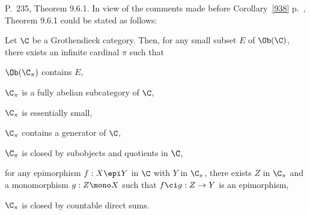 \documentclass[12pt]{article}
\theoremstyle{remark}
\theoremstyle{definition}
\begin{document}


\begin{s} 
P.~235, Theorem 9.6.1. In view of the comments made before Corollary~\ref{938} p.~, Theorem 9.6.1 could be stated as follows:

\begin{thm}[Theorem 9.6.1 p. 235]
Let $\C$ be a Grothendieck category. Then, for any small subset $E$ of $\Ob(\C)$, there exists an infinite cardinal $\pi$ such that

 $\Ob(\C_\pi)$ contains $E$,

 $\C_\pi$ is a fully abelian subcategory of $\C$,

 $\C_\pi$ is essentially small,

 $\C_\pi$ contains a generator of $\C$,

 $\C_\pi$ is closed by subobjects and quotients in $\C$,

 for any epimorphism $f:X\epi Y$ in $\C$ with $Y$ in $\C_\pi$, there exists $Z$ in $\C_\pi$ and a monomorphism $g:Z\mono X$ such that $f\ci g:Z\to Y$ is an epimorphism,

 $\C_\pi$ is closed by countable direct sums.
\end{thm}
\end{s}

%
\end{document}
